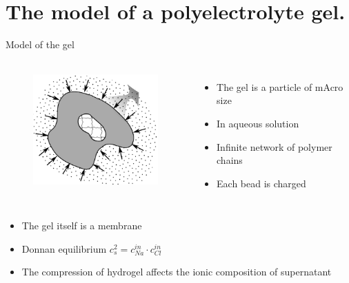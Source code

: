 \documentclass[10pt]{beamer}
\begin{document}
\section{The model of a polyelectrolyte gel.}
\begin{frame}[fragile]{Model of the gel}
  \begin{columns}[T,onlytextwidth]%
\begin{figure}
\includegraphics[height=4.5cm]{figures/gel_donnan.png}
\end{figure}   
  
  
\begin{itemize}
\item The gel is a particle of mAcro size 
\item In aqueous solution
\item Infinite network of polymer chains
\item Each bead is charged
\end{itemize}


  \end{columns}%
\begin{itemize}
\item The gel itself is a membrane
\item Donnan equilibrium
$c_s^2 = c^{in}_{Na}\cdot c^{in}_{Cl}$
\item The compression of hydrogel  affects the ionic composition of supernatant
\end{itemize}
  
\end{frame}

\end{document}
